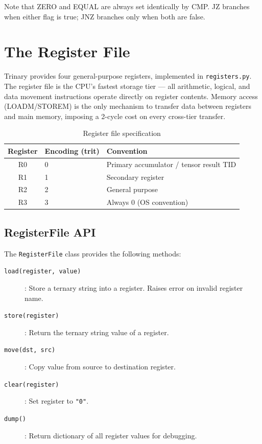 \documentclass[10pt,a4paper,twoside]{book}
\begin{document}
Note that ZERO and EQUAL are always set identically by CMP. JZ branches when either
flag is true; JNZ branches only when both are false.

\chapter{The Register File}
\label{ch:registers}

Trinary provides four general-purpose registers, implemented in \texttt{registers.py}.
The register file is the CPU's fastest storage tier — all arithmetic, logical, and
data movement instructions operate directly on register contents. Memory access
(LOADM/STOREM) is the only mechanism to transfer data between registers and main
memory, imposing a 2-cycle cost on every cross-tier transfer.

\begin{table}[H]
\centering
\caption{Register file specification}
\label{tab:regs}
\begin{tabular}{cll}
\toprule
Register & Encoding (trit) & Convention \\
\midrule
R0 & 0 & Primary accumulator / tensor result TID \\
R1 & 1 & Secondary register \\
R2 & 2 & General purpose \\
R3 & 3 & Always 0 (OS convention) \\
\bottomrule
\end{tabular}
\end{table}

\section{RegisterFile API}

The \texttt{RegisterFile} class provides the following methods:
\begin{description}
    \item[\texttt{load(register, value)}]: Store a ternary string into a register.
          Raises error on invalid register name.
    \item[\texttt{store(register)}]: Return the ternary string value of a register.
    \item[\texttt{move(dst, src)}]: Copy value from source to destination register.
    \item[\texttt{clear(register)}]: Set register to \texttt{"0"}.
    \item[\texttt{dump()}]: Return dictionary of all register values for debugging.
\end{description}
\end{document}
